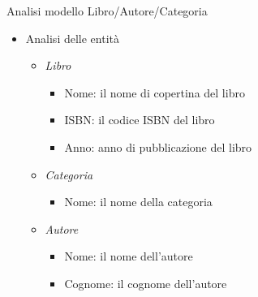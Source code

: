 \begin{frame}{Analisi modello Libro/Autore/Categoria}
    \begin{itemize}
        \item Analisi delle entità
            \begin{itemize}
                \item \textit{Libro}
                    \begin{itemize}
                        \item Nome: il nome di copertina del libro
                        \item ISBN: il codice ISBN del libro
                        \item Anno: anno di pubblicazione del libro
                    \end{itemize}
                \item \textit{Categoria}
                    \begin{itemize}
                        \item Nome: il nome della categoria
                    \end{itemize}
                \item \textit{Autore}
                    \begin{itemize}
                        \item Nome: il nome dell'autore
                        \item Cognome: il cognome dell'autore
                    \end{itemize}
            \end{itemize}
    \end{itemize}
\end{frame}

